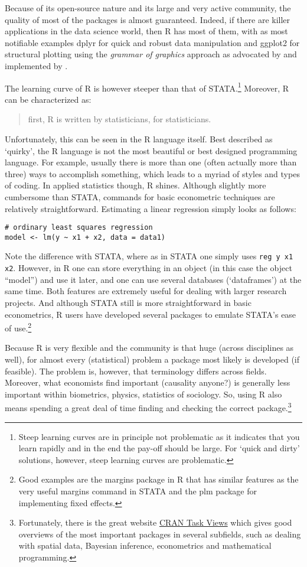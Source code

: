 \documentclass[fleqn,10pt]{SelfArx} %
\begin{document}
Because of its open-source nature and its large and very active community, the quality of most of the packages is almost guaranteed. Indeed, if there are killer applications in the data science world, then R has most of them, with as most notifiable examples dplyr for quick and robust data manipulation and ggplot2 for structural plotting using the \textit{grammar of graphics} approach as advocated by \citet{wilkinson2006grammar} and implemented by \citet{wickham2013implementation}. 

The learning curve of R is however steeper than that of STATA.\footnote{Steep learning curves are in principle not problematic as it indicates that you learn rapidly and in the end the pay-off should be large. For `quick and dirty' solutions, however, steep learning curves are problematic.} Moreover, R can be characterized as:
\begin{quote}
	first, R is written by statisticians, for statisticians.
\end{quote}
Unfortunately, this can be seen in the R language itself. Best described as `quirky', the R language is not the most beautiful or best designed programming language. For example, usually there is more than one (often actually more than three) ways to accomplish something, which leads to a myriad of styles and types of coding. In applied statistics though, R shines. Although slightly more cumbersome than STATA, commands for basic econometric techniques are relatively straightforward. Estimating a linear regression simply looks as follows:

\begin{lstlisting}
# ordinary least squares regression
model <- lm(y ~ x1 + x2, data = data1)
\end{lstlisting}
Note the difference with STATA, where as in STATA one simply uses \texttt{reg y x1 x2}. However, in R one can store everything in an object (in this case the object ``model'') and use it later, and one can use several databases (`dataframes') at the same time. Both features are extremely useful for dealing with larger research projects. And although STATA still is more straightforward in basic econometrics, R users have developed several packages to emulate STATA's ease of use.\footnote{Good examples are the margins package in R that has similar features as the very useful margins command in STATA and the plm package for implementing fixed effects.}

Because R is very flexible and the community is that huge (across disciplines as well), for almost every (statistical) problem a package most likely is developed (if feasible). The problem is, however, that terminology differs across fields. Moreover, what economists find important (causality anyone?) is generally less important within biometrics, physics, statistics of sociology. So, using R also means spending a great deal of time finding and checking the correct package.\footnote{Fortunately, there is the great website \href{https://cran.r-project.org/web/views/}{CRAN Task Views} which gives good overviews of the most important packages in several subfields, such as dealing with spatial data, Bayesian inference, econometrics and mathematical programming.}
\end{document}
